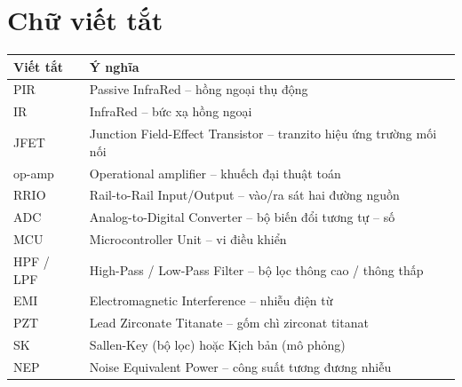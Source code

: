 
\section*{Chữ viết tắt}
\begin{longtable}{@{}p{2.6cm}p{12.2cm}@{}}
\toprule
\textbf{Viết tắt} & \textbf{Ý nghĩa} \\ \midrule
\endhead
PIR  & Passive InfraRed -- hồng ngoại thụ động \\
IR   & InfraRed -- bức xạ hồng ngoại \\
JFET & Junction Field-Effect Transistor -- tranzito hiệu ứng trường mối nối \\
op-amp & Operational amplifier -- khuếch đại thuật toán \\
RRIO & Rail-to-Rail Input/Output -- vào/ra sát hai đường nguồn \\
ADC  & Analog-to-Digital Converter -- bộ biến đổi tương tự -- số \\
MCU  & Microcontroller Unit -- vi điều khiển \\
HPF / LPF & High-Pass / Low-Pass Filter -- bộ lọc thông cao / thông thấp \\
EMI  & Electromagnetic Interference -- nhiễu điện từ \\
PZT  & Lead Zirconate Titanate -- gốm chì zirconat titanat \\
SK   & Sallen-Key (bộ lọc) \quad hoặc \quad Kịch bản (mô phỏng) \\
NEP  & Noise Equivalent Power -- công suất tương đương nhiễu \\
\bottomrule
\end{longtable}

